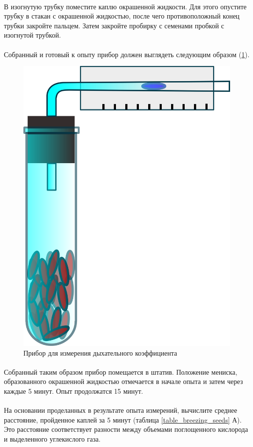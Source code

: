 \paragraph*{}В изогнутую трубку поместите каплю окрашенной жидкости. Для этого опустите трубку в стакан с окрашенной жидкостью, после чего противоположный конец трубки закройте пальцем. Затем закройте пробирку с семенами пробкой с изогнутой трубкой.

\paragraph*{}Собранный и готовый к опыту прибор должен выглядеть следующим образом (\ris \ref{breazing_index}). 

\begin{figure}[h!]
  \centering
       \includegraphics[width=0.3\linewidth]{pictures/breazing_index}
\caption{Прибор для измерения дыхательного коэффициента}
\label{breazing_index}
\end{figure}

\paragraph*{}Собранный таким образом прибор помещается в штатив. Положение мениска, образованного окрашенной жидкостью отмечается в начале опыта и затем через каждые 5 минут. Опыт продолжатся 15 минут.

\paragraph*{}На основании проделанных в результате опыта измерений, вычислите среднее расстояние, пройденное каплей за 5 минут (таблица \ref{table_breezing_seeds} А). Это расстояние соответствует разности между объемами поглощенного кислорода и выделенного углекислого газа.


